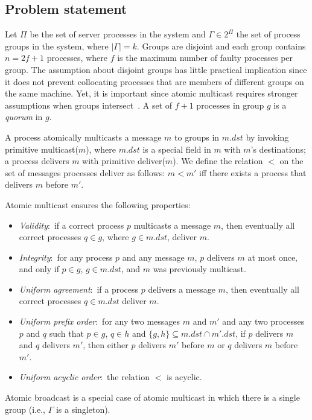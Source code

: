 \subsection{Problem statement}
\label{sec:amcast}

Let $\Pi$ be the set of server processes in the system and $\Gamma \in 2^{\Pi}$ the set of process groups in the system, where $|\Gamma| = k$.
Groups are disjoint and each group contains $n = 2f+1$ processes, where $f$ is the maximum number of faulty processes per group.  
The assumption about disjoint groups has little practical implication since it does not prevent collocating processes that are members of different groups on the same machine.
Yet, it is important since atomic multicast requires stronger assumptions when groups intersect~\cite{GS01b}.
A set of $f + 1$ processes in group $g$ is a \emph{quorum} in $g$.

A process atomically multicasts a message $m$ to groups in $m.dst$ by invoking primitive multicast($m$), where $m.dst$ is a special field in $m$ with $m$'s destinations; a process delivers $m$ with primitive deliver($m$). 
We define the relation $<$ on the set of messages processes deliver as follows: $m < m'$ iff there exists a process that delivers $m$ before $m'$. 

Atomic multicast ensures the following properties: 
\begin{itemize}
\item \textit{Validity}:~if a correct process $p$ multicasts a message $m$, then eventually all correct processes $q \in g$, where $g \in m.\mathit{dst}$, deliver $m$.
\item \textit{Integrity}:~for any process $p$ and any message $m$, $p$ delivers $m$ at most once, and only if $p \in g$, $g \in m.\mathit{dst}$, and $m$ was previously multicast.
\item \textit{Uniform agreement}:~if a process $p$ delivers a message $m$, then eventually all correct processes $q\in m.\mathit{dst}$ deliver $m$.
\item \textit{Uniform prefix order}:~for any two messages $m$ and $m'$ and any two processes $p$ and $q$ such that $p \in g$, $q \in h$ and $\{ g, h \} \subseteq m.\mathit{dst} \cap m'.\mathit{dst}$, if $p$ delivers $m$ and $q$ delivers $m'$, then either $p$ delivers $m'$ before $m$ or $q$ delivers $m$ before $m'$.
\item \textit{Uniform acyclic order}:~the relation $<$ is acyclic.
\end{itemize}
Atomic broadcast is a special case of atomic multicast in which there is a single group (i.e., $\Gamma$ is a singleton).

